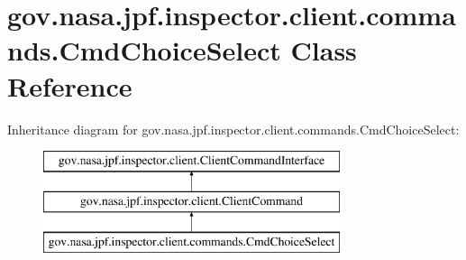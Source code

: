 \hypertarget{classgov_1_1nasa_1_1jpf_1_1inspector_1_1client_1_1commands_1_1_cmd_choice_select}{}\section{gov.\+nasa.\+jpf.\+inspector.\+client.\+commands.\+Cmd\+Choice\+Select Class Reference}
\label{classgov_1_1nasa_1_1jpf_1_1inspector_1_1client_1_1commands_1_1_cmd_choice_select}
Inheritance diagram for gov.\+nasa.\+jpf.\+inspector.\+client.\+commands.\+Cmd\+Choice\+Select\+:\begin{figure}[H]
\begin{center}
\leavevmode
\includegraphics[height=3.000000cm]{classgov_1_1nasa_1_1jpf_1_1inspector_1_1client_1_1commands_1_1_cmd_choice_select}
\end{center}
\end{figure}
